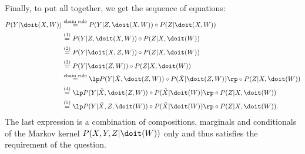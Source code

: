 {Finally, to put all together, we get the sequence of equations:
\begin{align}
    P(Y|\doit(X,W)) 
&\stackrel{\text{chain rule}}{=} P(Y|Z,\doit(X,W)) \circ P(Z|\doit(X,W)) \\
&\stackrel{(1)}{=} P(Y|Z,\doit(X,W)) \circ P(Z|X,\doit(W)) \\
&\stackrel{(2)}{=} P(Y|\doit(X,Z,W)) \circ P(Z|X,\doit(W)) \\
&\stackrel{(3)}{=} P(Y|\doit(Z,W)) \circ P(Z|X,\doit(W)) \\
&\stackrel{\text{chain rule}}{=} \lp P(Y|\tilde X, \doit(Z,W)) \circ P(\tilde X|\doit(Z,W)) \rp \circ P(Z|X,\doit(W)) \\
&\stackrel{(4)}{=} \lp P(Y|\tilde X, \doit(Z,W)) \circ P(\tilde X|\doit(W)) \rp \circ P(Z|X,\doit(W)) \\
&\stackrel{(5)}{=} \lp P(Y|\tilde X,Z,\doit(W)) \circ P(\tilde X|\doit(W)) \rp \circ P(Z|X,\doit(W)).
\end{align}
The last expression is a combination of compositions, marginals and conditionals of the Markov kernel $P(X,Y,Z|\doit(W))$ only and thus satisfies the requirement of the question.


}
